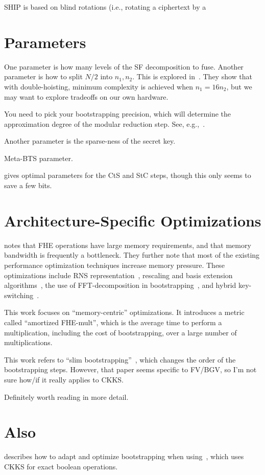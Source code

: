 \documentclass[../fheimpl.tex]{subfiles}
\begin{document}
    SHIP is based on blind rotations (i.e., rotating a ciphertext by a
    
    \section{Parameters}
    One parameter is how many levels of the \textsf{SF} decomposition to fuse. Another parameter is how to split $N/2$ into $n_1, n_2$. This is explored in~\cite{cryptoeprint:2020/1203}. They show that with double-hoisting, minimum complexity is achieved when $n_1=16n_2$, but we may want to explore tradeoffs on our own hardware.
    
    You need to pick your bootstrapping precision, which will determine the approximation degree of the modular reduction step. See, e.g.,~\cite{cryptoeprint:2021/572}.
    
    Another parameter is the sparse-ness of the secret key.
    
    Meta-BTS parameter.

    \cite{cryptoeprint:2024/1379} gives optimal parameters for the CtS and StC steps, though this only seems to save a few bits.
    
    \section{Architecture-Specific Optimizations}
    \cite{cryptoeprint:2021/508} notes that FHE operations have large memory requirements, and that memory bandwidth is frequently a bottleneck. They further note that most of the existing performance optimization techniques increase memory pressure. These optimizations include RNS representation~\cite{cryptoeprint:2016/510, cryptoeprint:2018/931}, rescaling and basis extension algorithms~\cite{cryptoeprint:2018/931}, the use of FFT-decomposition in bootstrapping~\cite{cryptoeprint:2018/1043,cryptoeprint:2018/1073}, and hybrid key-switching~\cite{cryptoeprint:2019/688}.
    
    This work focuses on ``memory-centric'' optimizations. It introduces a metric called ``amortized FHE-mult'', which is the average time to perform a multiplication, including the cost of bootstrapping, over a large number of multiplications.
    
    This work refers to ``slim bootstrapping''~\cite{cryptoeprint:2018/067}, which changes the order of the bootstrapping steps. However, that paper seems specific to FV/BGV, so I'm not sure how/if it really applies to CKKS.
	
    Definitely worth reading in more detail.
    

    \section{Also}
    \cite{cryptoeprint:2024/767} describes how to adapt and optimize bootstrapping when using~\cite{cryptoeprint:2022/1298}, which uses CKKS for exact boolean operations.

    \ifcompileasbook
    \else
        \printbibliography
    \fi
\end{document}
